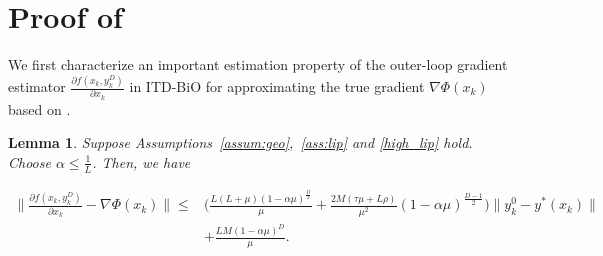 \documentclass{osudissert96}
\newtheorem{lemma}{Lemma}
\begin{document}
\section{Proof of~}\label{append:itd-bio}
We first characterize an important estimation property of the outer-loop gradient estimator $\frac{\partial f(x_k,y^D_k)}{\partial x_k}$ in ITD-BiO for approximating the true gradient $\nabla \Phi(x_k)$ based on .

\begin{lemma}\label{prop:partialG}  
Suppose Assumptions~\ref{assum:geo},~\ref{ass:lip} and \ref{high_lip} hold. Choose  $\alpha\leq \frac{1}{L}$. Then, we have
\begin{small}
\begin{align*}
\Big\|\frac{\partial f(x_k,y^D_k)}{\partial x_k}-\nabla\Phi(x_k)\Big\| \leq&\big( \frac{L(L+\mu)(1-\alpha\mu)^{\frac{D}{2}}}{\mu} +\frac{2M\left(  \tau\mu+ L\rho \right)}{\mu^2}(1-\alpha\mu)^{\frac{D-1}{2}} \big)\|y^0_k-y^*(x_k)\|  \nonumber
\\&+ \frac{LM(1-\alpha\mu)^D}{\mu}.
\end{align*}
\end{small}
\end{lemma}
\end{document}
